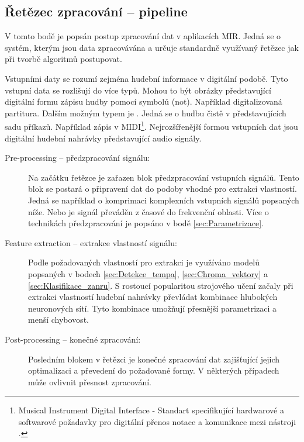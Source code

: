    \subsection{Řetězec zpracování -- pipeline}

    V tomto bodě je popsán postup zpracování dat v aplikacích \acs{MIR}.
    Jedná se o systém, kterým jsou data zpracovávána a určuje standardně využívaný řetězec jak při tvorbě algoritmů postupovat.
    
    Vstupními daty se rozumí zejména hudební informace v digitální podobě.
    Tyto vstupní data se rozlišují do více typů. Mohou to být obrázky představující digitální formu zápisu hudby pomocí symbolů (not)\cite{a_new_companion_to_digital_humanities}.
    Například digitalizovaná partitura.
    Dalším možným typem je .
    Jedná se o hudbu čistě v  představujících sadu příkazů.
    Například zápis v \acs{MIDI}\footnote{Musical Instrument Digital Interface -
    Standart specifikující hardwarové a softwarové požadavky pro digitální přenos notace a komunikace mezi nástroji \cite{wiki:MIDI}.}.
    Nejrozšířenější formou vstupních dat jsou digitální hudební nahrávky představující audio signály.

    \begin{description}
      \item[Pre-processing -- předzpracování signálu:] Na začátku řetězce je zařazen blok předzpracování vstupních signálů. Tento blok se postará o připravení dat do podoby vhodné pro extrakci vlastností. Jedná se například o komprimaci komplexních vstupních signálů popsaných níže. Nebo je signál převáděn z časové do frekvenční oblasti. Více o technikách předzpracování je popsáno v bodě \ref{sec:Parametrizace}.
      \item[Feature extraction -- extrakce vlastností signálu:] Podle požadovaných vlastností pro extrakci je využíváno modelů popsaných v bodech \ref{sec:Detekce_tempa}, \ref{sec:Chroma_vektory} a \ref{sec:Klasifikace_zanru}. S rostoucí popularitou strojového učení začaly při extrakci vlastností hudební nahrávky převládat kombinace hlubokých neuronových sítí. Tyto kombinace umožňují přesnější parametrizaci a menší chybovost.
      \item[Post-processing -- konečné zpracování:] Posledním blokem v řetězci je konečné zpracování dat zajišťující jejich optimalizaci a převedení do požadované formy. V některých případech může ovlivnit přesnost zpracování.
    \end{description}

